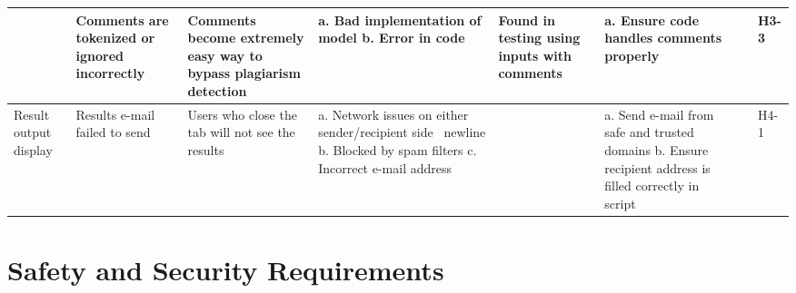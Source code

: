 \documentclass{article}
\begin{document}
\begin{landscape}
\begin{table}[ht]
{\begin{tabular}{|p{1.75cm}|p{4cm}|p{5cm}|p{5cm}|p{3cm}|p{5cm}|p{2cm}|p{2cm}|}
        \cline{2-8}
        & Comments are tokenized or ignored incorrectly & Comments become extremely easy way to bypass plagiarism detection & a. Bad implementation of model \newline b. Error in code & Found in testing using inputs with comments & a. Ensure code handles comments properly & & H3-3\\
        \hline
        Result output display & Results e-mail failed to send & Users who close the tab will not see the results & a. Network issues on either sender/recipient side \ newline b. Blocked by spam filters \newline c. Incorrect e-mail address & & a. Send e-mail from safe and trusted domains b. Ensure recipient address is filled correctly in script & & H4-1 \\
        \hline
        \end{tabular}
        } %
        \label{table:fmea}
    \end{table}
\end{landscape}
   

\section{Safety and Security Requirements}
\end{document}
